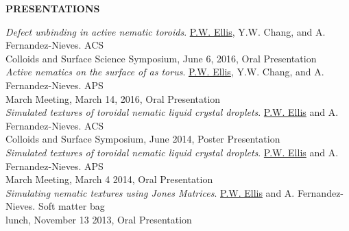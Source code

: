 \documentclass[10pt]{article}
\newenvironment{changemargin}[2]{%
  \list{}{\rightmargin#2\leftmargin#1
    \parsep=0pt\topsep=1pt\partopsep=0pt}
\item[]} {\endlist}
\newenvironment{indentmore}{\begin{changemargin}{10pt}{0cm}}{\end{changemargin}}
\begin{document}
\textbf{\large PRESENTATIONS}
\begin{indentmore}
\emph{Defect unbinding in active nematic toroids}. \underline{P.W. Ellis}, Y.W. Chang, and A. Fernandez-Nieves. ACS\\ \hspace*{15pt}Colloids and Surface Science Symposium, June 6, 2016, Oral Presentation\\

\emph{Active nematics on the surface of as torus}. \underline{P.W. Ellis}, Y.W. Chang, and A. Fernandez-Nieves. APS\\ \hspace*{15pt}March Meeting, March 14, 2016, Oral Presentation\\

\emph{Simulated textures of toroidal nematic liquid crystal droplets}. \underline{P.W. Ellis} and A. Fernandez-Nieves. ACS\\ \hspace*{15pt}Colloids and Surface Symposium, June 2014, Poster Presentation\\

\emph{Simulated textures of toroidal nematic liquid crystal droplets}. \underline{P.W. Ellis} and A. Fernandez-Nieves. APS\\ \hspace*{15pt}March Meeting, March 4 2014, Oral Presentation\\

\emph{Simulating nematic textures using Jones Matrices}. \underline{P.W. Ellis} and A. Fernandez-Nieves. Soft matter bag\\ \hspace*{15pt} lunch, November 13 2013, Oral Presentation\\
\end{indentmore}
 
%
%
%
%
\newpage 
\end{document}
